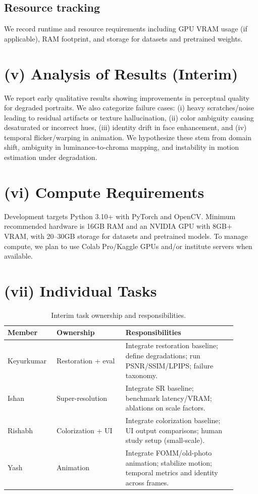 \documentclass[10pt,twocolumn,letterpaper]{article}
\begin{document}
\subsection{Resource tracking}
We record runtime and resource requirements including GPU VRAM usage (if applicable), RAM footprint, and storage for datasets and pretrained weights.

\section{(v) Analysis of Results (Interim)}
We report early qualitative results showing improvements in perceptual quality for degraded portraits. We also categorize failure cases:
(i) heavy scratches/noise leading to residual artifacts or texture hallucination,
(ii) color ambiguity causing desaturated or incorrect hues,
(iii) identity drift in face enhancement, and
(iv) temporal flicker/warping in animation.
We hypothesize these stem from domain shift, ambiguity in luminance-to-chroma mapping, and instability in motion estimation under degradation.

\section{(vi) Compute Requirements}
Development targets Python 3.10+ with PyTorch and OpenCV. Minimum recommended hardware is 16GB RAM and an NVIDIA GPU with 8GB+ VRAM, with 20--30GB storage for datasets and pretrained models. To manage compute, we plan to use Colab Pro/Kaggle GPUs and/or institute servers when available.

\section{(vii) Individual Tasks}
\begin{table}[t]
\centering
\small
\begin{tabular}{@{}p{0.17\linewidth}p{0.28\linewidth}p{0.45\linewidth}@{}}
\toprule
\textbf{Member} & \textbf{Ownership} & \textbf{Responsibilities} \\
\midrule
Keyurkumar & Restoration + eval & Integrate restoration baseline; define degradations; run PSNR/SSIM/LPIPS; failure taxonomy. \\
Ishan & Super-resolution & Integrate SR baseline; benchmark latency/VRAM; ablations on scale factors. \\
Rishabh & Colorization + UI & Integrate colorization baseline; UI output comparisons; human study setup (small-scale). \\
Yash & Animation & Integrate FOMM/old-photo animation; stabilize motion; temporal metrics and identity across frames. \\
\bottomrule
\end{tabular}
\caption{Interim task ownership and responsibilities.}
\end{table}
\end{document}
